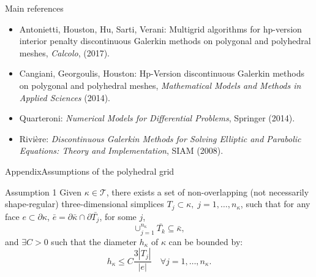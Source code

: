\documentclass{beamer}
\begin{document}
\begin{frame}{Main references}
\begin{itemize}
	\item Antonietti, Houston, Hu, Sarti, Verani: Multigrid
	algorithms for hp-version interior penalty discontinuous Galerkin methods
	on polygonal and polyhedral meshes, \emph{Calcolo}, (2017).
	\item Cangiani, Georgoulis, Houston: Hp-Version discontinuous
	Galerkin methods on polygonal and polyhedral meshes, \emph{Mathematical
		Models and Methods in Applied Sciences} (2014).
	\item Quarteroni: \emph{Numerical Models for Differential Problems}, Springer (2014).
	\item Rivière: \emph{Discontinuous Galerkin Methods for Solving Elliptic and
		Parabolic Equations: Theory and Implementation}, SIAM (2008).
\end{itemize}
\end{frame}
\appendix
\begin{frame}[label=supplemental]{Appendix}{Assumptions of the polyhedral
grid}
	\begin{block}{Assumption 1}
		Given $\kappa \in \mathcal{T}$, there exists a set of non-overlapping
		(not
		necessarily shape-regular) three-dimensional simplices $T_j \subset
		\kappa,
		\; j = 1,\dots, n_\kappa$, such that for any face $e \subset \partial
		\kappa$, $\bar{e} = \partial \bar{\kappa} \cap \partial \bar{T_j}$, for
		some $j$,
		\begin{equation*}
		\cup_{j = 1}^{n_\kappa} \bar{T_k} \subseteq \bar{\kappa},
		\end{equation*}
		and  $\exists C > 0$ such that the diameter $h_\kappa$ of $\kappa$ can
		be bounded by:
		\begin{equation*}
		h_\kappa \leq C \frac{3 |T_j|}{|e|} \quad \forall j = 1,\dots,n_\kappa.
		\end{equation*}
	\end{block}
\end{frame}
\end{document}
